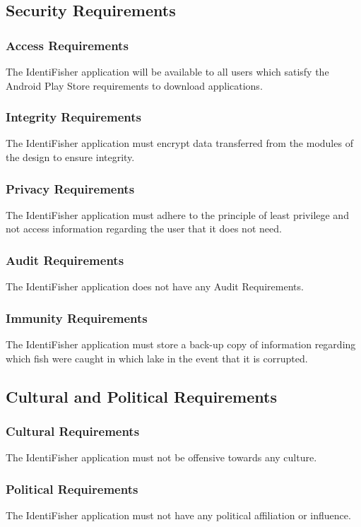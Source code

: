 \documentclass{article}
\begin{document}
\subsection{Security Requirements}
\subsubsection{Access Requirements}
The IdentiFisher application will be available to all users which satisfy the Android Play Store requirements to download applications.
\subsubsection{Integrity Requirements}
The IdentiFisher application must encrypt data transferred from the modules of the design to ensure integrity.
\subsubsection{Privacy Requirements}
The IdentiFisher application must adhere to the principle of least privilege and not access information regarding the user that it does not need.
\subsubsection{Audit Requirements}
The IdentiFisher application does not have any Audit Requirements.
\subsubsection{Immunity Requirements}
The IdentiFisher application must store a back-up copy of information regarding which fish were caught in which lake in the event that it is corrupted.

\subsection{Cultural and Political Requirements}
\subsubsection{Cultural Requirements}
The IdentiFisher application must not be offensive towards any culture.
\subsubsection{Political Requirements}
The IdentiFisher application must not have any political affiliation or influence.
\end{document}
